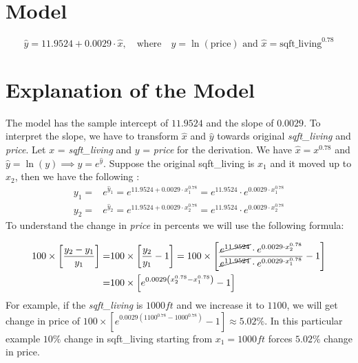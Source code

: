 \documentclass[12pt]{article}
\begin{document}
\section*{Model}
	\[\hat{y}=11.9524+0.0029\cdot \hat{x},\quad \text{where}\quad  \hat{y}=\ln (\text{price})\text{ and } \hat{x} = \text{sqft\_living}^{0.78}  \]
\section*{Explanation of the Model}
The model has the sample intercept of \(11.9524\) and the slope of \(0.0029\).  To interpret the slope, we have to transform \(\hat{x}\) and \(\hat{y}\) towards original {\it sqft\_living} and {\it price}. Let \(x\) = {\it sqft\_living}  and \(y\) = {\it price} for the derivation. We have  \(\hat{x} = x^{0.78}\) and \(\hat{y} = \ln (y)\implies y  = e^{\hat{y}}\). Suppose the original sqft\_living is \(x_1\) and it moved up to \(x_2\), then we have the following :
\begin{align*}
	y_1 =& e^{\hat{y}_1 }= e^{11.9524+0.0029\cdot x_1^{0.78}}  = e^{11.9524}\cdot e^{0.0029\cdot x_1^{0.78}}\\
	y_2 =& e^{\hat{y}_2 }= e^{11.9524+0.0029\cdot x_2^{0.78}}  = e^{11.9524}\cdot e^{0.0029\cdot x_2^{0.78}}
\end{align*}
To understand the change in {\it price} in percents we will use the following formula:

\begin{align*}
100 \times \left[\frac{y_2-y_1}{y_1} \right] =& 100 \times \left[\frac{y_2}{y_1} - 1\right] = 100\times \left[\frac{ \cancel{e^{11.9524}}\cdot e^{0.0029\cdot x_2^{0.78}}}{\cancel{e^{11.9524}}\cdot e^{0.0029\cdot x_1^{0.78}}} -1 \right] \\
=& 100 \times \left[ e^{0.0029\left( x_2^{0.78} - x_1^{0.78} \right)} -1 \right]
\end{align*}
For example, if the {\it sqft\_living} is \(1000ft\) and we increase it to \(1100\), we will get change in price of \(100\times \left[e^{0.0029(1100^{0.78}-1000^{0.78})}-1\right] \approx 5.02\% \). In this particular example \(10\%\) change in sqft\_living starting from \(x_1 = 1000ft\) forces \(5.02\%\) change in price.
\end{document}
